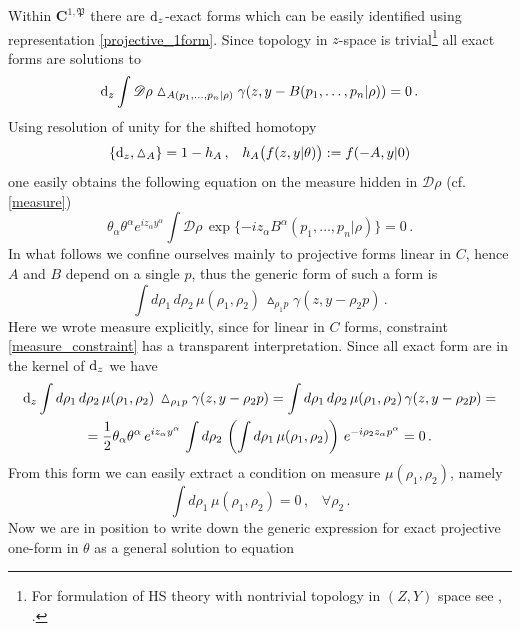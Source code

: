 \documentclass[12pt]{article}
\newcommand{\dr}{{{\rm d}}}
\newcommand{\hmt}{\vartriangle}
\begin{document}
Within $\mathbf{C}^{1,\mathfrak{P}}$ there are $\dr_z$-exact forms which can be easily identified using  representation \eqref{projective_1form}. Since topology in $z$-space is trivial\footnote{For formulation of HS theory with nontrivial topology in $(Z,Y)$ space see \cite{DeFilippi:2019jqq}, \cite{Diaz:2024kpr}.} all exact forms are solutions to 
\begin{equation}
\dr_z \int \mathscr{D}\rho \hmt_{A(p_1,\ldots,p_n|\rho)}\gamma(z,y-B(p_1,\ldots, p_n|\rho))=0\,.
\end{equation}
Using resolution of unity for the shifted homotopy 
\begin{equation}\label{shift_unity}
\{\dr_z,\hmt_A\}=1-h_A\,,\;\;\; h_{A}\big(f(z,y|\theta)\big):=f(-A,y|0)
\end{equation}
one easily obtains the following equation on the measure hidden in $\mathscr{D}\rho$ (cf. \eqref{measure})
\begin{equation}\label{measure_constraint}
\theta_\alpha \theta^\alpha e^{iz_\alpha y^\alpha}\int \mathscr{D}\rho\,\exp\{-iz_\alpha B^\alpha(p_1,\ldots,p_n|\rho)\}=0\,.
\end{equation}
In what follows we confine ourselves mainly to projective forms linear in $C$, hence $A$ and $B$ depend on a single $p$, thus the generic form of such a form is
\begin{equation}
\int d\rho_1 \, d\rho_2 \, \mu(\rho_1,\rho_2)\, \hmt_{\rho_1 p}\gamma(z,y-\rho_2 p)\,.
\end{equation}
Here we wrote measure explicitly, since for linear in $C$ forms, constraint \eqref{measure_constraint} has a transparent interpretation. Since all exact form are in the kernel of $\dr_z$ we have
\begin{multline}
\dr_z \int d\rho_1 \, d\rho_2 \, \mu(\rho_1,\rho_2)\, \hmt_{\rho_1 p}\gamma(z,y-\rho_2 p)=\int d\rho_1 \, d\rho_2 \, \mu(\rho_1,\rho_2)\, \gamma(z,y-\rho_2 p)=\\
=\frac{1}{2} \theta_\alpha \theta^\alpha\, e^{iz_\alpha y^\alpha}\, \int d\rho_2\,\left(\int d\rho_1\, \mu(\rho_1,\rho_2)\right)\, e^{-i\rho_2 z_\alpha p^\alpha}=0\,.
\end{multline}
From this form we can easily extract a condition on measure $\mu(\rho_1,\rho_2)$, namely
\begin{equation}\label{condition}
\int d\rho_1\, \mu(\rho_1,\rho_2)=0\,,\;\;\; \forall \rho_2\,.
\end{equation}
Now we are in position to write down the generic expression for exact projective one-form in $\theta$ as a general solution to equation
\end{document}
